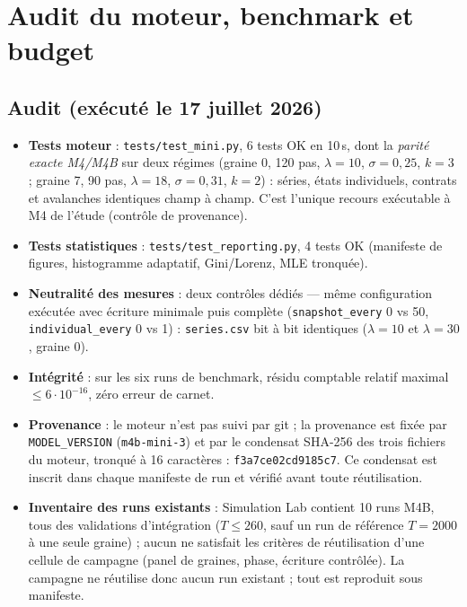 \documentclass[11pt,a4paper]{article}
\newcommand{\code}[1]{\texttt{#1}}
\begin{document}
\section{Audit du moteur, benchmark et budget}
\label{sec:audit}

\subsection{Audit (exécuté le 17 juillet 2026)}

\begin{itemize}
\item \textbf{Tests moteur} : \code{tests/test\_mini.py}, 6 tests OK en
  10\,s, dont la \emph{parité exacte M4/M4B} sur deux régimes (graine 0,
  120 pas, $\lambda=10$, $\sigma=0{,}25$, $k=3$ ; graine 7, 90 pas,
  $\lambda=18$, $\sigma=0{,}31$, $k=2$) : séries, états individuels,
  contrats et avalanches identiques champ à champ. C'est l'unique recours
  exécutable à M4 de l'étude (contrôle de provenance).
\item \textbf{Tests statistiques} : \code{tests/test\_reporting.py},
  4 tests OK (manifeste de figures, histogramme adaptatif, Gini/Lorenz,
  MLE tronquée).
\item \textbf{Neutralité des mesures} : deux contrôles dédiés --- même
  configuration exécutée avec écriture minimale puis complète
  (\code{snapshot\_every} 0 vs 50, \code{individual\_every} 0 vs 1) :
  \code{series.csv} bit à bit identiques ($\lambda=10$ et $\lambda=30$,
  graine 0).
\item \textbf{Intégrité} : sur les six runs de benchmark, résidu comptable
  relatif maximal $\le 6\cdot10^{-16}$, zéro erreur de carnet.
\item \textbf{Provenance} : le moteur n'est pas suivi par git ; la
  provenance est fixée par \code{MODEL\_VERSION} (\code{m4b-mini-3}) et par
  le condensat SHA-256 des trois fichiers du moteur, tronqué à 16
  caractères : \code{f3a7ce02cd9185c7}. Ce condensat est inscrit dans
  chaque manifeste de run et vérifié avant toute réutilisation.
\item \textbf{Inventaire des runs existants} : Simulation Lab contient 10
  runs M4B, tous des validations d'intégration ($T\le260$, sauf un run de
  référence $T=2000$ à une seule graine) ; aucun ne satisfait les critères
  de réutilisation d'une cellule de campagne (panel de graines, phase,
  écriture contrôlée). La campagne ne réutilise donc aucun run existant ;
  tout est reproduit sous manifeste.
\end{itemize}
\end{document}
